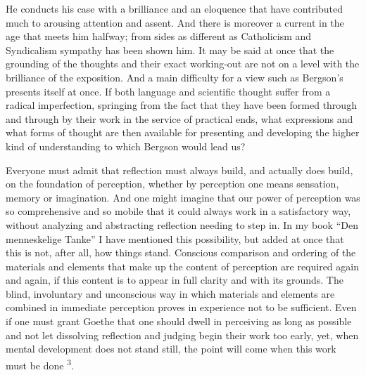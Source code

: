 \documentclass[12pt,a4paper,openany]{book}
\newcommand{\opage}[1]{\marginnote{\footnotesize\textit{[#1]}}}
\newcommand{\nm}[1]{\unskip\textsuperscript{#1}}
\begin{document}
He conducts his case with a brilliance and an eloquence that have contributed much to arousing attention and assent. And there is moreover a current in the age that meets him halfway; from sides as different as Catholicism and Syndicalism sympathy has been shown him.
\opage{5}It may be said at once that the grounding of the thoughts and their exact working-out are not on a level with the brilliance of the exposition. And a main difficulty for a view such as Bergson's presents itself at once. If both language and scientific thought suffer from a radical imperfection, springing from the fact that they have been formed through and through by their work in the service of practical ends, what expressions and what forms of thought are then available for presenting and developing the higher kind of understanding to which Bergson would lead us?

Everyone must admit that reflection must always build, and actually does build, on the foundation of perception, whether by perception one means sensation, memory or imagination. And one might imagine that our power of perception was so comprehensive and so mobile that it could always work in a satisfactory way, without analyzing and abstracting reflection needing to step in. In my book ``Den menneskelige Tanke'' I have mentioned this possibility, but added at once that this is not, after all, how things stand. Conscious comparison and ordering of the materials and elements that make up the content of perception are required again and again, if this content is to appear in full clarity and with its grounds. The blind, involuntary and unconscious way in which materials and elements are combined in immediate perception proves in experience not to be sufficient. Even if one must grant Goethe that one should dwell in perceiving as long as possible and not let dissolving reflection and judging begin their work too early, yet, when mental development does not stand still, the point will come when this work must be done \nm{3}.
\end{document}
